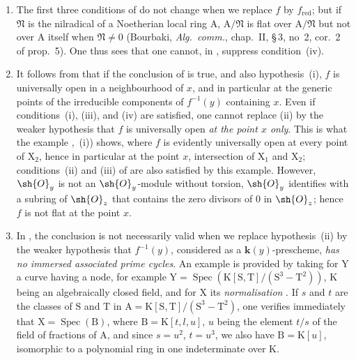 \begin{remarks}[15.2.4]
\label{IV.15.2.4}
\begin{enumerate}[label=(\roman*)]
  \item The first three conditions of  do not change when we replace $f$ by $f_\mathrm{red}$; but if $\mathfrak{N}$ is the nilradical of a Noetherian local ring $\mathrm{A}$, $\mathrm{A}/\mathfrak{N}$ is flat over $\mathrm{A}/\mathfrak{N}$ but not over $\mathrm{A}$ itself when $\mathfrak{N}\neq 0$ (Bourbaki, \emph{Alg.\ comm.}, chap.~II, \S\,3, no~2, cor.~2 of prop.~5).
One thus sees that one cannot, in , suppress condition~(iv).
  \item It follows from  that if the conclusion of  is true, and also hypothesis~(i), $f$ is universally open in a neighbourhood of $x$, and in particular at the generic points of the irreducible components of $f^{-1}(y)$ containing $x$.
Even if conditions~(i), (iii), and (iv) are satisfied, one cannot replace (ii) by the weaker hypothesis that $f$ is universally open \emph{at the point $x$ only}.
This is what the example ,~(i)) shows, where $f$ is evidently universally open at every point of $\mathrm{X}_2$, hence in particular at the point $x$, intersection of $\mathrm{X}_1$ and $\mathrm{X}_2$; conditions~(ii) and (iii) of  are also satisfied by this example.
However, $\sh{O}_y$ is not an $\sh{O}_y$-module without torsion, $\sh{O}_y$ identifies with a subring of $\sh{O}_z$ that contains the zero divisors of $0$ in $\sh{O}_z$; hence $f$ is not flat at the point $x$.
  \item In , the conclusion is not necessarily valid when we replace hypothesis~(ii) by the weaker hypothesis that $f^{-1}(y)$, considered as a $\mathbf{k}(y)$-prescheme, \emph{has no immersed associated prime cycles}.
An example is provided by taking for $\mathrm{Y}$ a curve having a node, for example $\mathrm{Y}=\operatorname{Spec}(\mathrm{K}[\mathrm{S},\mathrm{T}]/(\mathrm{S}^3-\mathrm{T}^2))$, $\mathrm{K}$ being an algebraically closed field, and for $\mathrm{X}$ its \emph{normalisation} .
If $s$ and $t$ are the classes of $\mathrm{S}$ and $\mathrm{T}$ in $\mathrm{A}=\mathrm{K}[\mathrm{S},\mathrm{T}]/(\mathrm{S}^3-\mathrm{T}^2)$, one verifies immediately that $\mathrm{X}=\operatorname{Spec}(\mathrm{B})$, where $\mathrm{B}=\mathrm{K}[t,l,u]$, $u$ being the element $t/s$ of the field of fractions of $\mathrm{A}$, and since $s=u^2$, $t=u^3$, we also have $\mathrm{B}=\mathrm{K}[u]$, isomorphic to a polynomial ring in one indeterminate over $\mathrm{K}$.

\end{enumerate}
\end{remarks}
